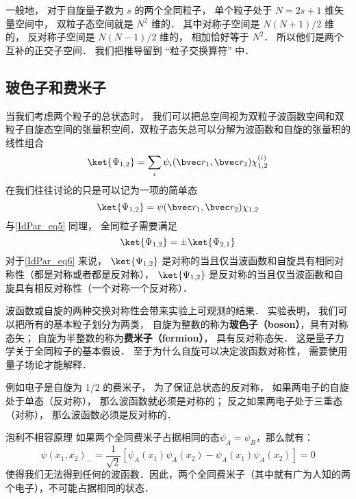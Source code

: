 一般地， 对于自旋量子数为 $s$ 的两个全同粒子， 单个粒子处于 $N = 2s+1$ 维矢量空间中， 双粒子态空间就是 $N^2$ 维的． 其中对称子空间是 $N(N+1)/2$ 维的， 反对称子空间是 $N(N-1)/2$ 维的， 相加恰好等于 $N^2$． 所以他们是两个互补的正交子空间． 我们把推导留到 “粒子交换算符” 中．

\subsection{玻色子和费米子}
当我们考虑两个粒子的总状态时， 我们可以把总空间视为双粒子波函数空间和双粒子自旋态空间的张量积空间．双粒子态矢总可以分解为波函数和自旋的张量积的线性组合 %
\begin{equation}
\ket{\Psi_{1,2}} = \sum_i \psi_i(\bvec r_1, \bvec r_2) \chi^{(i)}_{1,2}
\end{equation}
在我们往往讨论的只是可以记为一项的简单态
\begin{equation}\label{IdPar_eq6}
\ket{\Psi_{1,2}} = \psi(\bvec r_1, \bvec r_2) \chi_{1,2}
\end{equation}
与\autoref{IdPar_eq5} 同理， 全同粒子需要满足
\begin{equation}\label{IdPar_eq4}
\ket{\Psi_{1,2}} = \pm \ket{\Psi_{2,1}}
\end{equation}
对于\autoref{IdPar_eq6} 来说， $\ket{\Psi_{1,2}}$ 是对称的当且仅当波函数和自旋具有相同对称性（都是对称或者都是反对称）， $\ket{\Psi_{1,2}}$ 是反对称的当且仅当波函数和自旋具有相反对称性（一个对称一个反对称）．

波函数或自旋的两种交换对称性会带来实验上可观测的结果． 实验表明， 我们可以把所有的基本粒子划分为两类， 自旋为整数的称为\textbf{玻色子（boson）}，具有对称态矢； 自旋为半整数的称为\textbf{费米子（fermion）}， 具有反对称态矢． 这是量子力学关于全同粒子的基本假设． 至于为什么自旋可以决定波函数对称性， 需要使用量子场论才能解释． %

例如电子是自旋为 1/2 的费米子， 为了保证总状态的反对称， 如果两电子的自旋处于单态（反对称）， 那么波函数就必须是对称的； 反之如果两电子处于三重态（对称）， 那么波函数必须是反对称的．

\begin{corollary}{泡利不相容原理}
如果两个全同费米子占据相同的态$\psi_A=\psi_B$，那么就有：
\begin{equation}
\psi(x_1,x_2)_-=\frac{1}{\sqrt{2}}[\psi_A(x_1)\psi_A(x_2)-\psi_A(x_1)\psi_A(x_2)]=0
\end{equation}
使得我们无法得到任何的波函数．因此，两个全同费米子（其中就有广为人知的两个电子），不可能占据相同的状态．
\end{corollary}

